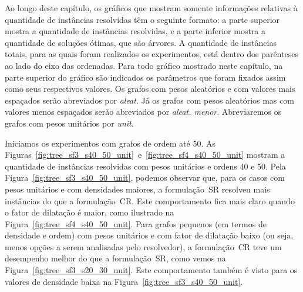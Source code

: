 Ao longo deste capítulo, os gráficos que mostram somente informações
relativas à quantidade de instâncias resolvidas têm o seguinte
formato: a parte superior mostra a quantidade de instâncias
resolvidas, e a parte inferior mostra a quantidade de soluções ótimas,
que são árvores. A quantidade de instâncias totais, para as quais
foram realizados os experimentos, está dentro dos parênteses ao lado
do eixo das ordenadas.  Para todo gráfico mostrado neste capítulo, na
parte superior do gráfico são indicados os parâmetros que
foram fixados assim como seus respectivos valores.  Os grafos com
pesos aleatórios e com valores mais espaçados serão abreviados por
\emph{aleat}.  Já os grafos com pesos aleatórios mas com valores menos
espaçados serão abreviados por \emph{aleat. menor}. Abreviaremos os
grafos com pesos unitários por \emph{unit}.

Iniciamos os experimentos com grafos de ordem até 50.  As
Figuras~\ref{fig:tree_sf3_s40_50_unit}~e~\ref{fig:tree_sf4_s40_50_unit}
mostram a quantidade de instâncias resolvidas com pesos unitários
e ordens 40 e 50.  Pela Figura~\ref{fig:tree_sf3_s40_50_unit}, podemos
observar que, para os casos com pesos unitários e com densidades
maiores, a formulação~SR resolveu mais instâncias do que a
formulação~CR. Este comportamento fica mais claro quando o fator de
dilatação é maior, como ilustrado na
Figura~\ref{fig:tree_sf4_s40_50_unit}.  Para grafos pequenos (em
termos de densidade e ordem) com pesos unitários e com fator de
dilatação baixo (ou seja, menos opções a serem analisadas pelo
resolvedor), a formulação~CR teve um desempenho melhor do que a 
formulação~SR, como vemos na
Figura~\ref{fig:tree_sf3_s20_30_unit}. Este comportamento também é
visto para os valores de densidade baixa na
Figura~\ref{fig:tree_sf3_s40_50_unit}.

